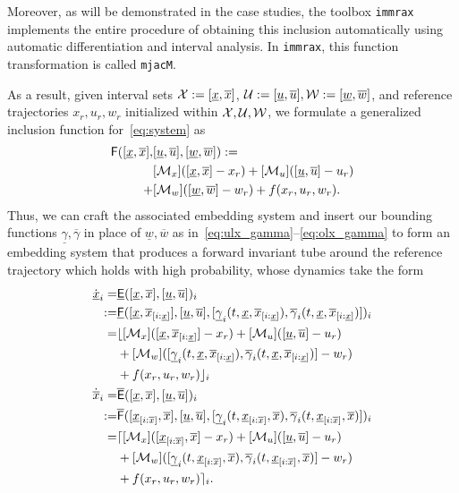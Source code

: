 \documentclass{IEEEojcsys}
\newcommand{\ul}{\underline}
\newcommand{\ol}{\overline}
\newcommand{\immrax}{{\texttt{immrax}}}
\begin{document}
Moreover, as will be demonstrated in the case studies, the toolbox \immrax{} \cite{immrax} implements the entire procedure of obtaining this inclusion automatically using automatic differentiation and interval analysis. In \immrax{}, this function transformation is called  \texttt{mjacM}.

As a result, given interval sets $\calX:=[\ulx, \olx]$, 
$\calU:=[\ul{u}, \ol{u}], \calW:=[\ul{w}, \ol{w}]$, and reference trajectories $x_r, u_r, w_r$ initialized within $\mathcal{X}, \mathcal{U}, \mathcal{W}$, we formulate a generalized inclusion function for~\eqref{eq:system} as
\begin{align}
    \sfF([\ul{x}, \ol{x}], &[\ul{u}, \ol{u}], [\ul{w}, \ol{w}]) := \label{eq:openloop_inc}\\
    &[\mathcal{M}_x]([\ulx, \olx] - x_r) + [\mathcal{M}_u]([\ul{u}, \ol{u}] - u_r) \nonumber\\
    + &[\mathcal{M}_w]([\ul{w}, \ol{w}] - w_r) + f(x_r, u_r, w_r). \nonumber
\end{align}
Thus, we can craft the associated embedding system and insert our bounding functions $\ul{\gamma}, \ol{\gamma}$ in place of $\ul{w}, \ol{w}$ as in~\eqref{eq:ulx_gamma}--\eqref{eq:olx_gamma} to form an embedding system that produces a forward invariant tube around the reference trajectory which holds with high probability, whose dynamics take the form
\begin{align}
    \dot{\ul{x}}_i= &\ul{\sfE}([\ul{x}, \ol{x}], [\ul{u}, \ol{u}])_i \label{eq:init_mixed_emb_lower}\\
    := &\ul{\sfF}([\ul{x}, \ol{x}_{[i:\ul{x}]}], [\ul{u}, \ol{u}], [\ul{\gamma}_i(t, \ul{x}, \ol{x}_{[i:\ul{x}]}), \ol{\gamma}_i(t, \ul{x}, \ol{x}_{[i:\ul{x}]})])_i\nonumber\\
    =&\lfloor[\mathcal{M}_x]([\ulx, \olx_{[i:\ul{x}]}] - x_r) + [\mathcal{M}_u]([\ul{u}, \ol{u}] - u_r) \nonumber\\
     &+ [\mathcal{M}_w]([\ul{\gamma}_i(t, \ul{x}, \ol{x}_{[i:\ul{x}]}), \ol{\gamma}_i(t, \ul{x}, \ol{x}_{[i:\ul{x}]})] - w_r) \nonumber \\
     &+ f(x_r, u_r, w_r)\rfloor_i\nonumber \\
    \dot{\ol{x}}_i= &\ol{\sfE}([\ul{x}, \ol{x}], [\ul{u}, \ol{u}])_i \label{eq:init_mixed_emb_upper}\\
    := &\ol{\sfF}([\ul{x}_{[i:\ol{x}]}, \ol{x}], [\ul{u}, \ol{u}], [\ul{\gamma}_i(t, \ul{x}_{[i:\ol{x}]}, \ol{x}), \ol{\gamma}_i(t, \ul{x}_{[i:\ol{x}]}, \ol{x})])_i\nonumber \\
    =&\lceil[\mathcal{M}_x]([\ulx_{[i:\ol{x}]}, \olx] - x_r) + [\mathcal{M}_u]([\ul{u}, \ol{u}] - u_r) \nonumber\\
     &+ [\mathcal{M}_w]([\ul{\gamma}_i(t, \ul{x}_{[i:\ol{x}]}, \ol{x}), \ol{\gamma}_i(t, \ul{x}_{[i:\ol{x}]}, \ol{x})] - w_r) \nonumber \\
     &+ f(x_r, u_r, w_r)\rceil_i.\nonumber
\end{align}
\end{document}
